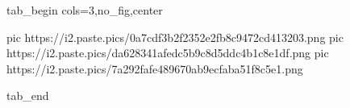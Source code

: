  
 
 
 
 


\ifcmt
  tab_begin cols=3,no_fig,center

     pic https://i2.paste.pics/0a7cdf3b2f2352e2fb8c9472cd413203.png
		 pic https://i2.paste.pics/da628341afedc5b9c8d5ddc4b1c8e1df.png
		 pic https://i2.paste.pics/7a292fafe489670ab9ecfaba51f8c5e1.png

  tab_end
\fi
